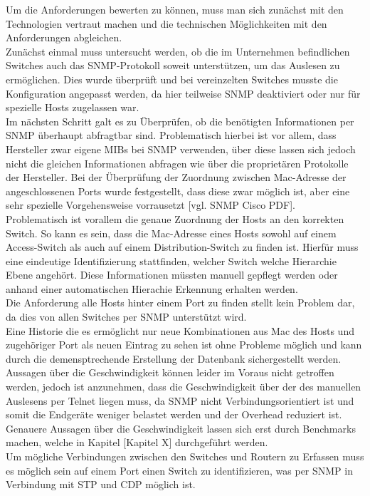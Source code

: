 Um die Anforderungen bewerten zu können, muss man sich zunächst mit den Technologien vertraut machen und die technischen Möglichkeiten mit den Anforderungen abgleichen.\\
Zunächst einmal muss untersucht werden, ob die im Unternehmen befindlichen Switches auch das SNMP-Protokoll soweit unterstützen, um das Auslesen zu ermöglichen.
Dies wurde überprüft und bei vereinzelten Switches musste die Konfiguration angepasst werden, da hier teilweise SNMP deaktiviert oder nur für spezielle Hosts zugelassen war.\\
Im nächsten Schritt galt es zu Überprüfen, ob die benötigten Informationen per SNMP überhaupt abfragtbar sind. Problematisch hierbei ist vor allem, dass Hersteller zwar eigene MIBs bei SNMP verwenden, über diese lassen sich jedoch nicht die gleichen Informationen abfragen wie über die proprietären Protokolle der Hersteller.
Bei der Überprüfung der Zuordnung zwischen Mac-Adresse der angeschlossenen Ports wurde festgestellt, dass diese zwar möglich ist, aber eine sehr spezielle Vorgehensweise vorrausetzt [vgl. SNMP Cisco PDF].\\
Problematisch ist vorallem die genaue Zuordnung der Hosts an den korrekten Switch. So kann es sein, dass die Mac-Adresse eines Hosts sowohl auf einem Access-Switch als auch auf einem Distribution-Switch zu finden ist. Hierfür muss eine eindeutige Identifizierung stattfinden, welcher Switch welche Hierarchie Ebene angehört. Diese Informationen müssten manuell gepflegt werden oder anhand einer automatischen Hierachie Erkennung erhalten werden.\\
Die Anforderung alle Hosts hinter einem Port zu finden stellt kein Problem dar, da dies von allen Switches per SNMP unterstützt wird. \\
Eine Historie die es ermöglicht nur neue Kombinationen aus Mac des Hosts und zugehöriger Port als neuen Eintrag zu sehen ist ohne Probleme möglich und kann durch die demensptrechende Erstellung der Datenbank sichergestellt werden.\\
Aussagen über die Geschwindigkeit können leider im Voraus nicht getroffen werden, jedoch ist anzunehmen, dass die Geschwindigkeit über der des manuellen Auslesens per Telnet liegen muss, da SNMP nicht Verbindungsorientiert ist und somit die Endgeräte weniger belastet werden und der Overhead reduziert ist. Genauere Aussagen über die Geschwindigkeit lassen sich erst durch Benchmarks machen, welche in Kapitel [Kapitel X] durchgeführt werden.\\
Um mögliche Verbindungen zwischen den Switches und Routern zu Erfassen muss es möglich sein auf einem Port einen Switch zu identifizieren, was per SNMP in Verbindung mit STP und CDP möglich ist.\\

